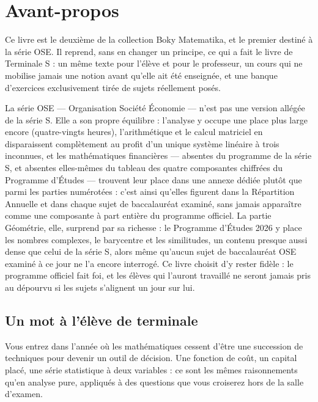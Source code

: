 \chapter*{Avant-propos}

Ce livre est le deuxième de la collection Boky Matematika, et le premier
destiné à la série OSE. Il reprend, sans en changer un principe, ce qui a
fait le livre de Terminale S : un même texte pour l'élève et pour le
professeur, un cours qui ne mobilise jamais une notion avant qu'elle ait été
enseignée, et une banque d'exercices exclusivement tirée de sujets réellement
posés.

La série OSE — Organisation Société Économie — n'est pas une version allégée
de la série S. Elle a son propre équilibre : l'analyse y occupe une place
plus large encore (quatre-vingts heures), l'arithmétique et le calcul
matriciel en disparaissent complètement au profit d'un unique système linéaire
à trois inconnues, et les mathématiques financières — absentes du programme
de la série S, et absentes elles-mêmes du tableau des quatre composantes
chiffrées du Programme d'Études — trouvent leur place dans une annexe dédiée
plutôt que parmi les parties numérotées : c'est ainsi qu'elles figurent dans
la Répartition Annuelle et dans chaque sujet de baccalauréat examiné, sans
jamais apparaître comme une composante à part entière du programme officiel.
La partie Géométrie, elle, surprend par sa richesse : le Programme d'Études
2026 y place les nombres complexes, le barycentre et les similitudes, un
contenu presque aussi dense que celui de la série S, alors même qu'aucun
sujet de baccalauréat OSE examiné à ce jour ne l'a encore interrogé. Ce livre
choisit d'y rester fidèle : le programme officiel fait foi, et les élèves qui
l'auront travaillé ne seront jamais pris au dépourvu si les sujets s'alignent
un jour sur lui.

\section*{Un mot à l'élève de terminale}

Vous entrez dans l'année où les mathématiques cessent d'être une succession
de techniques pour devenir un outil de décision. Une fonction de coût, un
capital placé, une série statistique à deux variables : ce sont les mêmes
raisonnements qu'en analyse pure, appliqués à des questions que vous
croiserez hors de la salle d'examen.

